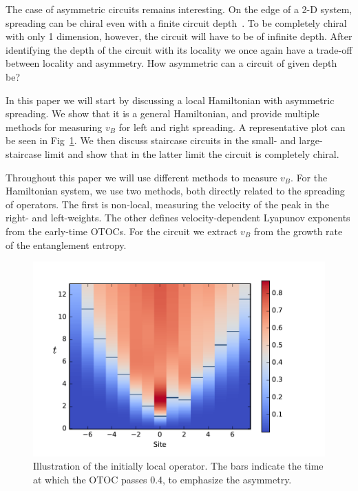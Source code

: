 \documentclass[aps,prx,reprint,superscriptaddress, longbibliography]{revtex4-1}
\newcommand{\charlie}[1]{{\color{Magenta}{{#1}}}}
\begin{document}
The case of asymmetric circuits remains interesting. On the edge of a 2-D system, spreading can be chiral even with a finite circuit depth~\cite{PoChiralCircuit}. To be completely chiral with only 1 dimension, however, the circuit will have to be of infinite depth. After identifying the depth of the circuit with its locality \charlie{(how?)} we once again have a trade-off between locality and asymmetry. How asymmetric can a circuit of given depth be?

In this paper we will start by discussing a local Hamiltonian with asymmetric spreading. We show that it is a general Hamiltonian, and provide multiple methods for measuring $v_B$ for left and right spreading. A representative plot can be seen in Fig~\ref{fig:colorplot}. We then discuss staircase circuits in the small- and large-staircase limit and show that in the latter limit the circuit is completely chiral.

Throughout this paper we will use different methods to measure $v_B$. For the Hamiltonian system, we use two methods, both directly related to the spreading of operators. The first is non-local, measuring the velocity of the peak in the right- and left-weights. The other defines velocity-dependent Lyapunov exponents from the early-time OTOCs. For the circuit we extract $v_B$ from the growth rate of the entanglement entropy.

\begin{figure}
	\includegraphics[width=\columnwidth]{colorplot}
	\caption{Illustration of the initially local operator. The bars indicate the time at which the OTOC passes 0.4, to emphasize the asymmetry.}
	\label{fig:colorplot}
\end{figure}
\end{document}
